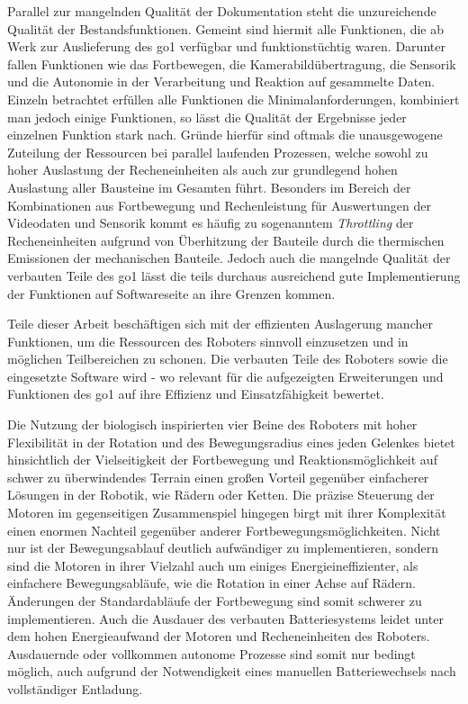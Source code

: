 Parallel zur mangelnden Qualität der Dokumentation steht die unzureichende Qualität der Bestandsfunktionen.
Gemeint sind hiermit alle Funktionen, die ab Werk zur Auslieferung des \gls{go1} verfügbar und funktionstüchtig waren.
Darunter fallen Funktionen wie das Fortbewegen, die Kamerabildübertragung, die Sensorik und die Autonomie in der Verarbeitung
und Reaktion auf gesammelte Daten.
Einzeln betrachtet erfüllen alle Funktionen die Minimalanforderungen, kombiniert man jedoch einige Funktionen, so lässt
die Qualität der Ergebnisse jeder einzelnen Funktion stark nach.
Gründe hierfür sind oftmals die unausgewogene Zuteilung der Ressourcen bei parallel laufenden Prozessen, welche sowohl zu
hoher Auslastung der Recheneinheiten als auch zur grundlegend hohen Auslastung aller Bausteine im Gesamten führt.
Besonders im Bereich der Kombinationen aus Fortbewegung und Rechenleistung für Auswertungen der Videodaten und Sensorik
kommt es häufig zu sogenanntem \emph{Throttling} der Recheneinheiten aufgrund von Überhitzung der Bauteile durch die thermischen
Emissionen der mechanischen Bauteile.
Jedoch auch die mangelnde Qualität der verbauten Teile des \gls{go1} lässt die teils durchaus ausreichend gute Implementierung der
Funktionen auf Softwareseite an ihre Grenzen kommen.

Teile dieser Arbeit beschäftigen sich mit der effizienten Auslagerung mancher Funktionen, um die Ressourcen des Roboters
sinnvoll einzusetzen und in möglichen Teilbereichen zu schonen.
Die verbauten Teile des Roboters sowie die eingesetzte Software wird - wo relevant für die aufgezeigten Erweiterungen und
Funktionen des \gls{go1} auf ihre Effizienz und Einsatzfähigkeit bewertet.



Die Nutzung der biologisch inspirierten vier Beine des Roboters mit hoher Flexibilität in der Rotation und des Bewegungsradius
eines jeden Gelenkes bietet hinsichtlich der Vielseitigkeit der Fortbewegung und Reaktionsmöglichkeit auf schwer zu
überwindendes Terrain einen großen Vorteil gegenüber einfacherer Lösungen in der Robotik, wie Rädern oder Ketten.
Die präzise Steuerung der Motoren im gegenseitigen Zusammenspiel hingegen birgt mit ihrer Komplexität einen enormen Nachteil
gegenüber anderer Fortbewegungsmöglichkeiten.
Nicht nur ist der Bewegungsablauf deutlich aufwändiger zu implementieren, sondern sind die Motoren in ihrer Vielzahl auch
um einiges Energieineffizienter, als einfachere Bewegungsabläufe, wie die Rotation in einer Achse auf Rädern.
Änderungen der Standardabläufe der Fortbewegung sind somit schwerer zu implementieren.
Auch die Ausdauer des verbauten Batteriesystems leidet unter dem hohen Energieaufwand der Motoren und Recheneinheiten des Roboters.
Ausdauernde oder vollkommen autonome Prozesse sind somit nur bedingt möglich, auch aufgrund der Notwendigkeit eines
manuellen Batteriewechsels nach vollständiger Entladung.

